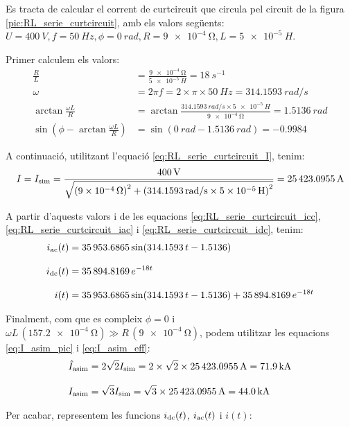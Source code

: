 \begin{exemple}\label{ex:CurtcircuitRL}
	\addcontentsxms{\CurtcircuitRL}		
    Es tracta de calcular el corrent de curtcircuit que circula pel circuit de la figura \vref{pic:RL_serie_curtcircuit}, amb els valors següents: $U=\qty{400}{V}, f=\qty{50}{Hz}, \phi=\qty{0}{rad}, R=\qty{9e-4}{\ohm}, L=\qty{5e-5}{H}$.

    Primer calculem els valors:
    \begin{align*}
    	\frac{R}{L} &= \frac{\qty{9e-4}{\ohm}}{\qty{5e-5}{H}} = \qty{18}{s^{-1}} \\[3mm]
        \omega &= 2\pi f = 2\times\pi\times\qty{50}{Hz} = \qty{314,1593}{rad/s} \\[3mm]
        \arctan\frac{\omega L}{R} &= \arctan\frac{\qty{314,1593}{rad/s}\times\qty{5e-5}{H}}{\qty{9e-4}{\ohm}} =
        \qty{1,5136}{rad}\\[3mm]
        \sin\left(\phi - \arctan\frac{\omega L}{R}\right) &= \sin(\qty{0}{rad} - \qty{1,5136}{rad})= \num{-0,9984}
    \end{align*}


    A continuació, utilitzant l'equació \eqref{eq:RL_serie_curtcircuit_I}, tenim:
    \[
        I= I_\mathrm{sim} =\frac{\qty{400}{V}}{\sqrt{\left(\qty{9e-4}{\ohm}\right)^2+\left(\qty{314,1593}{rad/s}\times \qty{5e-5}{H}\right)^2}} =
        \qty{25423,0955}{A}
    \]

      A partir d'aquests valors i de les equacions \eqref{eq:RL_serie_curtcircuit_icc}, \eqref{eq:RL_serie_curtcircuit_iac} i \eqref{eq:RL_serie_curtcircuit_idc}, tenim:
    \begin{align*}
        i_\mathrm{ac}(t) &= \num{35953,6865}\sin(\num{314,1593}\,t-\num{1,5136}) \\[0.3cm]
        i_\mathrm{dc}(t) &= \num{35894,8169}\,e^{-18 t}\\[0.3cm]
        i(t) &= \num{35953,6865}\sin(\num{314,1593}\,t-\num{1,5136}) + \num{35894,8169}\,e^{-18 t}
    \end{align*}

    Finalment, com que es compleix $\phi=0$ i $\omega L \,(\qty{157,2e-4}{\ohm}) \gg R\, (\qty{9e-4}{\ohm}) $, podem utilitzar les equacions \eqref{eq:I_asim_pic} i \eqref{eq:I_asim_eff}:
    \begin{align*}
        \hat{I}_\mathrm{asim} &= 2 \sqrt{2} I_\mathrm{sim}= 2 \times \sqrt{2} \times \qty{25423,0955}{A} = \qty{71,9}{kA}\\[0.3cm]
        I_\mathrm{asim} &= \sqrt{3} I_\mathrm{sim}= \sqrt{3} \times \qty{25423,0955}{A} = \qty{44,0}{kA}
    \end{align*}

    Per acabar, representem les funcions $i_\mathrm{dc}(t)$, $i_\mathrm{ac}(t)$ i $i(t)$:
    \begin{center}
        
    \end{center}
\end{exemple}


